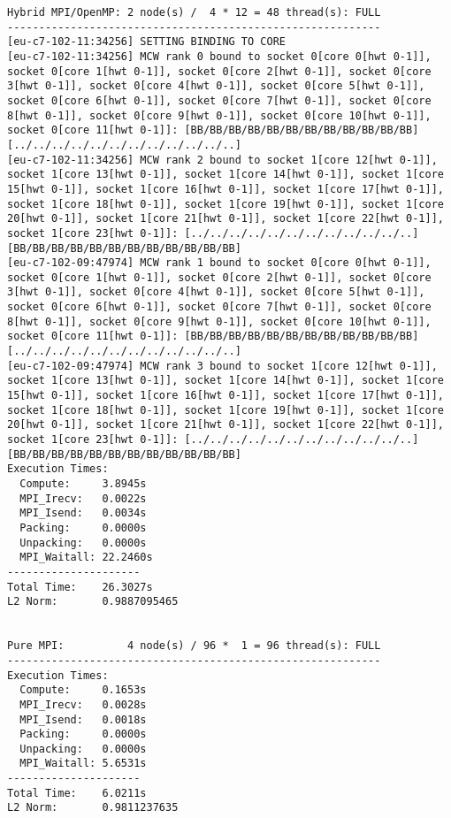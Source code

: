 \begin{lstlisting}[basicstyle=\tiny, frame=single, caption={Task 2: Collected Euler outputs.}, label={lst:1}]
Hybrid MPI/OpenMP: 2 node(s) /  4 * 12 = 48 thread(s): FULL
-----------------------------------------------------------
[eu-c7-102-11:34256] SETTING BINDING TO CORE
[eu-c7-102-11:34256] MCW rank 0 bound to socket 0[core 0[hwt 0-1]], socket 0[core 1[hwt 0-1]], socket 0[core 2[hwt 0-1]], socket 0[core 3[hwt 0-1]], socket 0[core 4[hwt 0-1]], socket 0[core 5[hwt 0-1]], socket 0[core 6[hwt 0-1]], socket 0[core 7[hwt 0-1]], socket 0[core 8[hwt 0-1]], socket 0[core 9[hwt 0-1]], socket 0[core 10[hwt 0-1]], socket 0[core 11[hwt 0-1]]: [BB/BB/BB/BB/BB/BB/BB/BB/BB/BB/BB/BB][../../../../../../../../../../../..]
[eu-c7-102-11:34256] MCW rank 2 bound to socket 1[core 12[hwt 0-1]], socket 1[core 13[hwt 0-1]], socket 1[core 14[hwt 0-1]], socket 1[core 15[hwt 0-1]], socket 1[core 16[hwt 0-1]], socket 1[core 17[hwt 0-1]], socket 1[core 18[hwt 0-1]], socket 1[core 19[hwt 0-1]], socket 1[core 20[hwt 0-1]], socket 1[core 21[hwt 0-1]], socket 1[core 22[hwt 0-1]], socket 1[core 23[hwt 0-1]]: [../../../../../../../../../../../..][BB/BB/BB/BB/BB/BB/BB/BB/BB/BB/BB/BB]
[eu-c7-102-09:47974] MCW rank 1 bound to socket 0[core 0[hwt 0-1]], socket 0[core 1[hwt 0-1]], socket 0[core 2[hwt 0-1]], socket 0[core 3[hwt 0-1]], socket 0[core 4[hwt 0-1]], socket 0[core 5[hwt 0-1]], socket 0[core 6[hwt 0-1]], socket 0[core 7[hwt 0-1]], socket 0[core 8[hwt 0-1]], socket 0[core 9[hwt 0-1]], socket 0[core 10[hwt 0-1]], socket 0[core 11[hwt 0-1]]: [BB/BB/BB/BB/BB/BB/BB/BB/BB/BB/BB/BB][../../../../../../../../../../../..]
[eu-c7-102-09:47974] MCW rank 3 bound to socket 1[core 12[hwt 0-1]], socket 1[core 13[hwt 0-1]], socket 1[core 14[hwt 0-1]], socket 1[core 15[hwt 0-1]], socket 1[core 16[hwt 0-1]], socket 1[core 17[hwt 0-1]], socket 1[core 18[hwt 0-1]], socket 1[core 19[hwt 0-1]], socket 1[core 20[hwt 0-1]], socket 1[core 21[hwt 0-1]], socket 1[core 22[hwt 0-1]], socket 1[core 23[hwt 0-1]]: [../../../../../../../../../../../..][BB/BB/BB/BB/BB/BB/BB/BB/BB/BB/BB/BB]
Execution Times:
  Compute:     3.8945s
  MPI_Irecv:   0.0022s
  MPI_Isend:   0.0034s
  Packing:     0.0000s
  Unpacking:   0.0000s
  MPI_Waitall: 22.2460s
---------------------
Total Time:    26.3027s
L2 Norm:       0.9887095465


Pure MPI:          4 node(s) / 96 *  1 = 96 thread(s): FULL
-----------------------------------------------------------
Execution Times:
  Compute:     0.1653s
  MPI_Irecv:   0.0028s
  MPI_Isend:   0.0018s
  Packing:     0.0000s
  Unpacking:   0.0000s
  MPI_Waitall: 5.6531s
---------------------
Total Time:    6.0211s
L2 Norm:       0.9811237635



\end{lstlisting}
